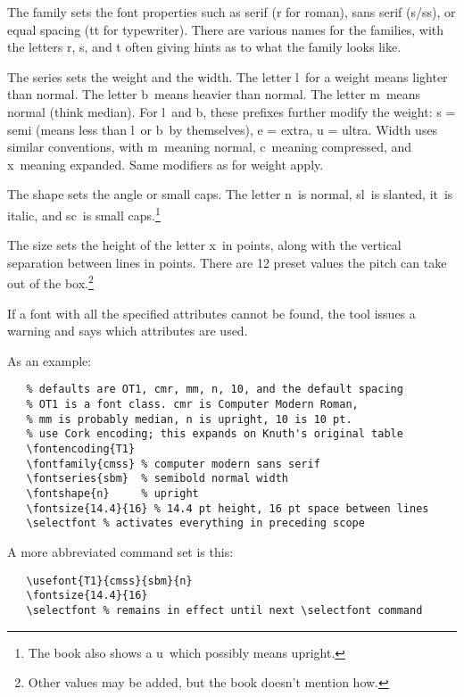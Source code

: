 The family sets the font properties such as serif (r for roman), sans serif (s/ss), or equal spacing (tt for typewriter). There are various names for the families, with the letters r, s, and t often giving hints as to what the family looks like.

The series sets the weight and the width. The letter \q l\q\ for a weight means lighter than normal. The letter \q b\q\ means heavier than normal. The letter \q m\q\ means normal (think median). For \q l\q\ and \q b\q, these prefixes further modify the weight: s = semi (means less than \q l\q\ or \q b\q\ by themselves), e = extra, u = ultra. Width uses similar conventions, with \q m\q\ meaning normal, \q c\q\ meaning compressed, and \q x\q\ meaning expanded. Same modifiers as for weight apply. 

The shape sets the angle or small caps. The letter \q n\q\ is normal, \q sl\q\ is slanted, \q it\q\ is italic, and \q  sc\q\ is small caps.\footnote{The book also shows a \q u\q\, which possibly means upright.}

The size sets the height of the letter \q x\q\ in points, along with the vertical separation between lines in points. There are 12 preset values the pitch can take out of the box.\footnote{Other values may be added, but the book doesn't mention how.}

If a font with all the specified attributes cannot be found, the tool issues a warning and says which attributes are used.

As an example: 

\begin{verbatim}
   % defaults are OT1, cmr, mm, n, 10, and the default spacing
   % OT1 is a font class. cmr is Computer Modern Roman,
   % mm is probably median, n is upright, 10 is 10 pt.
   % use Cork encoding; this expands on Knuth's original table
   \fontencoding{T1} 
   \fontfamily{cmss} % computer modern sans serif
   \fontseries{sbm}  % semibold normal width
   \fontshape{n}     % upright
   \fontsize{14.4}{16} % 14.4 pt height, 16 pt space between lines
   \selectfont % activates everything in preceding scope
\end{verbatim}

A more abbreviated command set is this: \begin{verbatim}
   \usefont{T1}{cmss}{sbm}{n}
   \fontsize{14.4}{16}
   \selectfont % remains in effect until next \selectfont command
\end{verbatim}